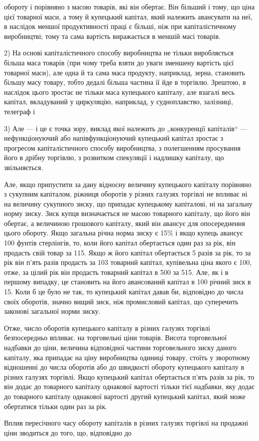 \parcont{}  %
обороту і порівняно з масою товарів, які він обертає. Він більший і
тому, що ціна цієї товарної маси, а тому й купецький капітал,
який належить авансувати на неї, в наслідок меншої продуктивності
праці є більші, ніж при капіталістичному виробництві;
тому та сама вартість виражається в меншій масі товарів.

2) На основі капіталістичного способу виробництва не тільки
виробляється більша маса товарів (при чому треба взяти до
уваги зменшену вартість цієї товарної маси), але одна й та сама
маса продукту, наприклад, зерна, становить більшу масу товару,
тобто дедалі більша частина її йде в торгівлю. Зрештою, в наслідок
цього зростає не тільки маса купецького капіталу, але
взагалі весь капітал, вкладуваний у циркуляцію, наприклад, у
судноплавство, залізниці, телеграф і~

3) Але — і це є точка зору, виклад якої належить до „конкуренції
капіталів“ — нефункціонуючий або напівфункціонуючий
купецький капітал зростає з прогресом капіталістичного способу
виробництва, з полегшенням просування його в дрібну торгівлю,
з розвитком спекуляції і надлишку капіталу, що звільняється.

Але, якщо припустити за дану відносну величину купецького
капіталу порівняно з сукупним капіталом, ріжниця оборотів
у різних галузях торгівлі не впливає ні на величину сукупного
зиску, що припадає купецькому капіталові, ні на загальну норму
зиску. Зиск купця визначається не масою товарного капіталу,
що його він обертає, а величиною грошового капіталу, який він
авансує для опосереднення цього обороту. Якщо загальна річна
норма зиску є 15\% і якщо купець авансує 100 фунтів стерлінгів,
то, коли його капітал обертається один раз за рік, він продасть
свій товар за 115. Якщо ж його капітал обертається 5 разів за
рік, то за рік він п’ять разів продасть за 103 товарний капітал,
купівельна ціна якого є 100, отже, за цілий рік він продасть
товарний капітал в 500 за 515. Але, як і в першому випадку, це
становить на його авансований капітал в 100 річний зиск в 15.
Коли б це було не так, то купецький капітал давав би, відповідно
до числа своїх оборотів, значно вищий зиск, ніж промисловий
капітал, що суперечить законові загальної норми зиску.

Отже, число оборотів купецького капіталу в різних галузях
торгівлі безпосередньо впливає. на торговельні ціни товарів. Висота
торговельної надбавки до ціни, величина відповідної частини
торговельного зиску даного капіталу, яка припадає на ціну
виробництва одиниці товару, стоїть у зворотному відношенні
до числа оборотів або до швидкості обороту купецького
капіталу в різних галузях торгівлі. Якщо купецький капітал
обертається п’ять разів за рік, то він додає до товарного капіталу
однакової вартості тільки  тієї надбавки, яку додає до товарного
капіталу однакової вартості другий купецький капітал, який може
обертатися тільки один раз за рік.

Вплив пересічного часу обороту капіталів в різних галузях
торгівлі на продажні ціни зводиться до того, що, відповідно до
\parbreak{}  %
